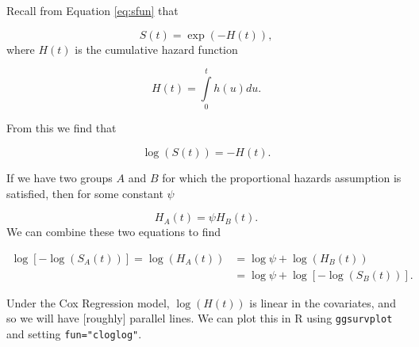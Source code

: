 \documentclass[
  openany]{book}
\theoremstyle{definition}
\theoremstyle{definition}
\theoremstyle{definition}
\theoremstyle{definition}
\theoremstyle{remark}
\begin{document}
Recall from Equation \eqref{eq:sfun} that

\[S\left(t\right) = \exp\left(-H\left(t\right)\right), \]
where \(H\left(t\right)\) is the cumulative hazard function

\[ H\left(t\right) = \int\limits_{0}^t h\left(u\right) du. \]

From this we find that

\[ \log \left(S\left(t\right)\right) = -H\left(t\right).\]

If we have two groups \(A\) and \(B\) for which the proportional hazards assumption is satisfied, then for some constant \(\psi\)

\[H_A\left(t\right) = \psi H_B\left(t\right). \]
We can combine these two equations to find

\begin{align*}
\log\left[-\log\left(S_A\left(t\right)\right)\right] = \log\left(H_A\left(t\right)\right) & = \log\psi + \log\left(H_B\left(t\right)\right)\\
& = \log\psi + \log\left[-\log\left(S_B\left(t\right)\right)\right].
\end{align*}

Under the Cox Regression model, \(\log\left(H\left(t\right)\right)\) is linear in the covariates, and so we will have {[}roughly{]} parallel lines. We can plot this in R using \texttt{ggsurvplot} and setting \texttt{fun="cloglog"}.
\end{document}
